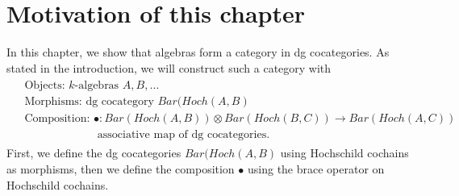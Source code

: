\section{Motivation of this chapter}
In this chapter, we show that algebras 
form a category in dg cocategories. 
As stated in the introduction, we will 
construct such a category with 
\begin{align*}
\begin{split}
	&\textrm{Objects: $k$-algebras } A,B,\dots\\
	&\textrm{Morphisms: dg cocategory } Bar(Hoch(A,B)\\
	&\textrm{Composition: } \bullet: Bar(Hoch(A,B)) \otimes 
	Bar(Hoch(B,C)) \to Bar(Hoch(A,C))\\
	&\phantom{Composition: }
	\textrm{ associative map of dg cocategories.}
\end{split}
\end{align*}
First, we define the dg cocategories 
$Bar(Hoch(A,B)$ using Hochschild cochains 
as morphisms, then we define the composition 
$\bullet$ using the brace operator on 
Hochschild cochains.